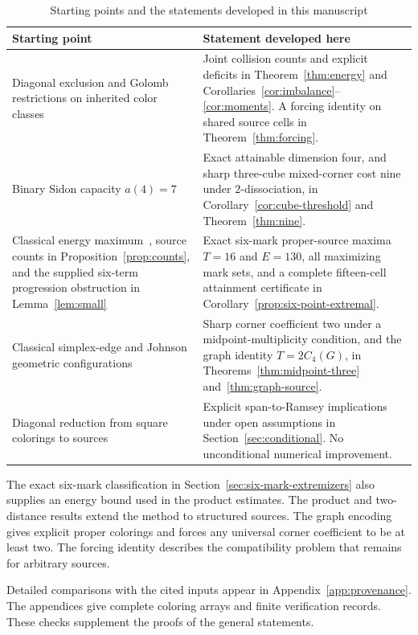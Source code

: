 \documentclass[11pt,a4paper]{article}
\newif\ifshowrevisions
\newcommand{\rev}[1]{{\ifshowrevisions\color{red}\fi #1}}
\newenvironment{revision}{\par\begingroup\ifshowrevisions\color{red}\fi}{\par\endgroup}
\theoremstyle{definition}
\numberwithin{equation}{section}
\begin{document}
\begin{revision}
\begin{table}[!htbp]
\centering\small
\ifshowrevisions\color{red}\fi
\caption{\rev{Starting points and the statements developed in this manuscript}}
\label{tab:contribution-overview}
\begin{tabularx}{\textwidth}{@{}>{\raggedright\arraybackslash}p{}Y@{}}
\toprule
Starting point & Statement developed here\\\midrule
Diagonal exclusion and Golomb restrictions on inherited color classes~\cite{CCFGMS23,MSY25}
& Joint collision counts and explicit deficits in Theorem~\ref{thm:energy} and Corollaries~\ref{cor:imbalance}--\ref{cor:moments}. A forcing identity on shared source cells in Theorem~\ref{thm:forcing}.\\[4pt]
Binary Sidon capacity $a(4)=7$~\cite{OEIS309370,Wood05}
& Exact attainable dimension four, and sharp three-cube mixed-corner cost nine under $2$-dissociation, in Corollary~\ref{cor:cube-threshold} and Theorem~\ref{thm:nine}.\\[4pt]
Classical energy maximum~\cite{Heg23}, source counts in Proposition~\ref{prop:counts}, and the supplied six-term progression obstruction in Lemma~\ref{lem:small}
& Exact six-mark proper-source maxima $T=16$ and $E=130$, all maximizing mark sets, and a complete fifteen-cell attainment certificate in Corollary~\ref{prop:six-point-extremal}.\\[4pt]
Classical simplex-edge and Johnson geometric configurations~\cite{Musin09,BSS12}
& Sharp corner coefficient two under a midpoint-multiplicity condition, and the graph identity $T=2C_4(G)$, in Theorems~\ref{thm:midpoint-three} and~\ref{thm:graph-source}.\\[4pt]
Diagonal reduction from square colorings to sources~\cite{CCFGMS23,MSY25}
& Explicit span-to-Ramsey implications under open assumptions in Section~\ref{sec:conditional}. No unconditional numerical improvement.\\\bottomrule
\end{tabularx}
\end{table}

The exact six-mark classification in Section~\ref{sec:six-mark-extremizers} also supplies an energy bound used in the product estimates. The product and two-distance results extend the method to structured sources. The graph encoding gives explicit proper colorings and forces any universal corner coefficient to be at least two. The forcing identity describes the compatibility problem that remains for arbitrary sources. 

Detailed comparisons with the cited inputs appear in Appendix~\ref{app:provenance}. The appendices give complete coloring arrays and finite verification records. These checks supplement the proofs of the general statements.
\end{revision}
\end{document}
